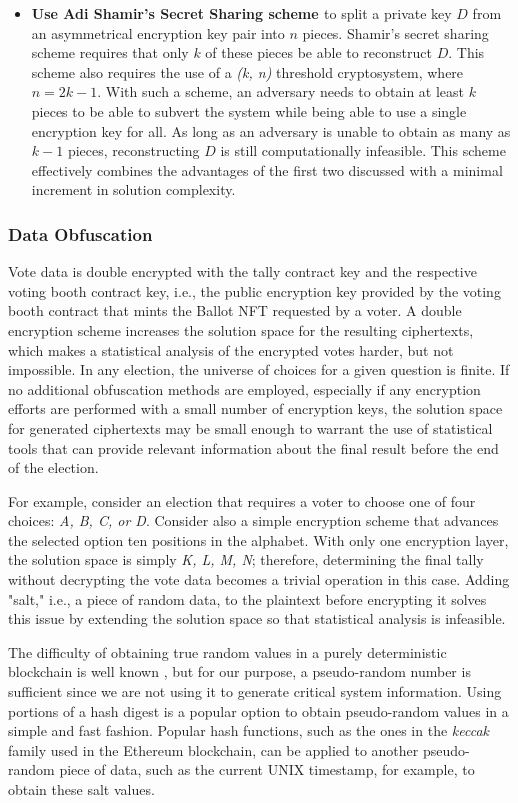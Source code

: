 \documentclass[../main.tex]{subfiles}
\begin{document}
\begin{itemize}
    \item{\textbf{Use Adi Shamir's Secret Sharing scheme \cite{Shamir1979}} to split a private key $ D $ from an asymmetrical encryption key pair into $ n $ pieces. Shamir's secret sharing scheme requires that only $ k $ of these pieces be able to reconstruct $ D $. This scheme also requires the use of a \textit{(k, n)} threshold cryptosystem, where $ n = 2k - 1 $. With such a scheme, an adversary needs to obtain at least $ k $ pieces to be able to subvert the system while being able to use a single encryption key for all. As long as an adversary is unable to obtain as many as $ k - 1 $ pieces, reconstructing $ D $ is still computationally infeasible. This scheme effectively combines the advantages of the first two discussed with a minimal increment in solution complexity.}
\end{itemize}

\subsubsection{Data Obfuscation}
\label{sec:data_obfuscation}
Vote data is double encrypted with the tally contract key and the respective voting booth contract key, i.e., the public encryption key provided by the voting booth contract that mints the Ballot NFT requested by a voter. A double encryption scheme increases the solution space for the resulting ciphertexts, which makes a statistical analysis of the encrypted votes harder, but not impossible. In any election, the universe of choices for a given question is finite. If no additional obfuscation methods are employed, especially if any encryption efforts are performed with a small number of encryption keys, the solution space for generated ciphertexts may be small enough to warrant the use of statistical tools that can provide relevant information about the final result before the end of the election.
\par
For example, consider an election that requires a voter to choose one of four choices: \textit{A, B, C, or D}. Consider also a simple encryption scheme that advances the selected option ten positions in the alphabet. With only one encryption layer, the solution space is simply \textit{K, L, M, N}; therefore, determining the final tally without decrypting the vote data becomes a trivial operation in this case. Adding "salt," i.e., a piece of random data, to the plaintext before encrypting it solves this issue by extending the solution space so that statistical analysis is infeasible.
\par
The difficulty of obtaining true random values in a purely deterministic blockchain is well known \cite{Antonopoulos2018}, but for our purpose, a pseudo-random number is sufficient since we are not using it to generate critical system information. Using portions of a hash digest is a popular option to obtain pseudo-random values in a simple and fast fashion. Popular hash functions, such as the ones in the \textit{keccak} family used in the Ethereum blockchain, can be applied to another pseudo-random piece of data, such as the current UNIX timestamp, for example, to obtain these salt values.
\end{document}
